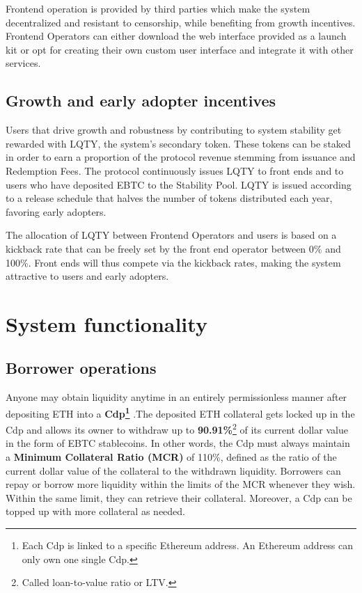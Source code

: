 \documentclass{article}
\begin{document}
Frontend operation is provided by third parties which make the system decentralized and resistant to censorship, while benefiting from growth incentives. Frontend Operators can either download the web interface provided as a launch kit or opt for creating their own custom user interface and integrate it with other services.

\subsection{Growth and early adopter incentives}
Users that drive growth and robustness by contributing to system stability get rewarded with LQTY, the system's secondary token. These tokens can be staked in order to earn a proportion of the protocol revenue stemming from issuance and Redemption Fees. The protocol continuously issues LQTY to front ends and to users who have deposited EBTC to the Stability Pool. LQTY is issued according to a release schedule that halves the number of tokens distributed each year, favoring early adopters.

The allocation of LQTY between Frontend Operators and users is based on a kickback rate that can be freely set by the front end operator between 0\% and 100\%. Front ends will thus compete via the kickback rates, making the system attractive to users and early adopters.

\section{System functionality}
\subsection{Borrower operations }
Anyone may obtain liquidity anytime in an entirely permissionless manner after depositing ETH into a \textbf{Cdp\footnote{Each Cdp is linked to a specific Ethereum address. An Ethereum address can only own one single Cdp.} }.The deposited ETH collateral gets locked up in the Cdp and allows its owner to withdraw up to \textbf{90.91\%}\footnote{Called loan-to-value ratio or LTV.} of its current dollar value in the form of EBTC stablecoins. In other words, the Cdp must always maintain a \textbf{Minimum Collateral Ratio (MCR)} of 110\%, defined as the ratio of the current dollar value of the collateral to the withdrawn liquidity. Borrowers can repay or borrow more liquidity within the limits of the MCR whenever they wish. Within the same limit, they can retrieve their collateral. Moreover, a Cdp can be topped up with more collateral as needed. 
\end{document}
